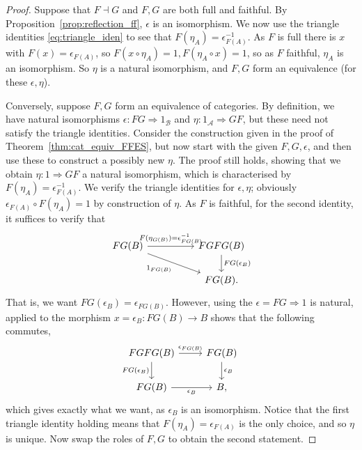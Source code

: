 \documentclass[a4paper,11pt]{article}
\theoremstyle{plain}
\theoremstyle{remark}
\newcommand{\mc}[1]{\mathcal{#1}}
\begin{document}
\begin{proof}
Suppose that $F \dashv G$ and $F,G$ are both full and faithful.  By Proposition~\ref{prop:reflection_ff}, $\epsilon$ is an isomorphism.  We now use the triangle identities \eqref{eq:triangle_iden} to see that $F(\eta_A) = \epsilon_{F(A)}^{-1}$.  As $F$ is full there is $x$ with $F(x) = \epsilon_{F(A)}$, so $F(x\circ \eta_A) = 1, F(\eta_A\circ x) = 1$, so as $F$ faithful, $\eta_A$ is an isomorphism.  So $\eta$ is a natural isomorphism, and $F,G$ form an equivalence (for these $\epsilon, \eta$).

Conversely, suppose $F, G$ form an equivalence of categories.  By definition, we have natural isomorphisms $\epsilon \colon FG \Rightarrow 1_{\mc B}$ and $\eta \colon 1_{\mc A} \Rightarrow GF$, but these need not satisfy the triangle identities.
Consider the construction given in the proof of Theorem~\ref{thm:cat_equiv_FFES}, but now start with the given $F,G,\epsilon$, and then use these to construct a possibly new $\eta$.  The proof still holds, showing that we obtain $\eta\colon 1 \Rightarrow GF$ a natural isomorphism, which is characterised by $F(\eta_A) = \epsilon_{F(A)}^{-1}$.  We verify the triangle identities for $\epsilon,\eta$; obviously $\epsilon_{F(A)} \circ F(\eta_A) = 1$ by construction of $\eta$.  As $F$ is faithful, for the second identity, it suffices to verify that
\[ \begin{tikzcd}
FG(B) \arrow[rr, "F(\eta_{G(B)}) = \epsilon_{FG(B)}^{-1}"] \arrow[rrd, "1_{FG(B)}"'] &&  FGFG(B)  \arrow[d, "FG(\epsilon_B)"]   \\
&&   FG(B).
\end{tikzcd} \]
That is, we want $FG(\epsilon_B) = \epsilon_{FG(B)}$.  However, using the $\epsilon = FG \Rightarrow 1$ is natural, applied to the morphism $x = \epsilon_B \colon FG(B) \to B$ shows that the following commutes,
\[ \begin{tikzcd}
  FGFG(B) \arrow[r, "\epsilon_{FG(B)}"] \arrow[d, "FG(\epsilon_B)"'] &  FG(B)  \arrow[d, "\epsilon_B"]  \\
  FG(B) \arrow[r, "\epsilon_B"']  & B,
\end{tikzcd} \]
which gives exactly what we want, as $\epsilon_B$ is an isomorphism.  Notice that the first triangle identity holding means that $F(\eta_A) = \epsilon_{F(A)}$ is the only choice, and so $\eta$ is unique.  Now swap the roles of $F,G$ to obtain the second statement.
\end{proof}
\end{document}
